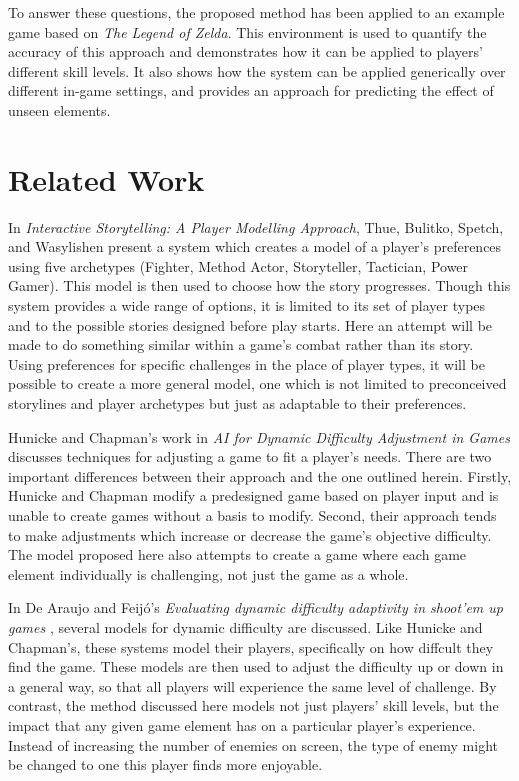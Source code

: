 \documentclass[a4paper]{article}
\begin{document}
\begin{multicols*}{2}
To answer these questions, the proposed method has been applied to an example game based on \emph{The Legend of Zelda}. This environment is used to quantify the accuracy of this approach and demonstrates how it can be applied to players' different skill levels. It also shows how the system can be applied generically over different in-game settings, and provides an approach for predicting the effect of unseen elements.

\section{Related Work}
In \cite{PlayerModeling} \emph{Interactive Storytelling: A Player Modelling Approach}, Thue, Bulitko, Spetch, and Wasylishen present a system which creates a model of a player's preferences using five archetypes (Fighter, Method Actor, Storyteller, Tactician, Power Gamer). This model is then used to choose how the story progresses. Though this system provides a wide range of options, it is limited to its set of player types and to the possible stories designed before play starts.
Here an attempt will be made to do something similar within a game's combat rather than its story. Using preferences for specific challenges in the place of player types, it will be possible to create a more general model, one which is not limited to preconceived storylines and player archetypes but just as adaptable to their preferences.

Hunicke and Chapman's work in \emph{AI for Dynamic Difficulty Adjustment in Games} \cite{DDAinGames} discusses techniques for adjusting a game to fit a player's needs. There are two important differences between their approach and the one outlined herein. Firstly, Hunicke and Chapman modify a predesigned game based on player input and is unable to create games without a basis to modify. Second, their approach tends to make adjustments which increase or decrease the game's objective difficulty. The model proposed here also attempts to create a game where each game element individually is challenging, not just the game as a whole.

In De Araujo and Feij\'o's \emph{Evaluating dynamic difficulty adaptivity in shoot’em up games} \cite{shootemup}, several models for dynamic difficulty are discussed. Like Hunicke and Chapman's, these systems model their players, specifically on how diffcult they find the game. These models are then used to adjust the difficulty up or down in a general way, so that all players will experience the same level of challenge. By contrast, the method discussed here models not just players' skill levels, but the impact that any given game element has on a particular player's experience. Instead of increasing the number of enemies on screen, the type of enemy might be changed to one this player finds more enjoyable.


\end{multicols*}
\end{document}
